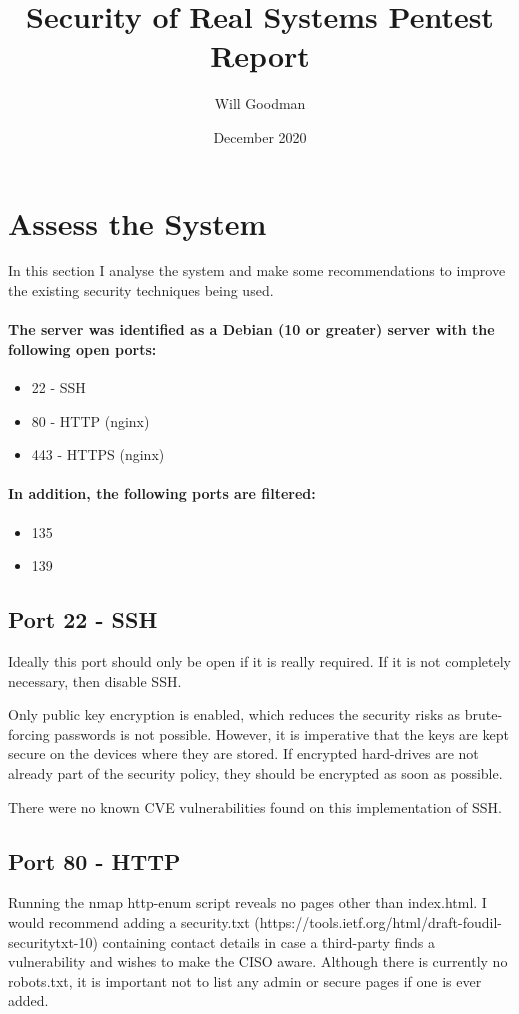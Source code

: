 \documentclass[12pt]{article}
\title{Security of Real Systems Pentest Report}
\date{December 2020}
\author{Will Goodman}
\begin{document}
  \maketitle

  \section{Assess the System}
  In this section I analyse the system and make some recommendations to improve the existing security techniques being used.

  \paragraph{The server was identified as a Debian (10 or greater) server with the following open ports:}
  \begin{itemize}
    \item 22 - SSH
    \item 80 - HTTP (nginx)
    \item 443 - HTTPS (nginx)
  \end{itemize}
  \paragraph{In addition, the following ports are filtered:}
  \begin{itemize}
    \item 135
    \item 139
  \end{itemize}

  \subsection{Port 22 - SSH}
  Ideally this port should only be open if it is really required.
  If it is not completely necessary, then disable SSH.

  Only public key encryption is enabled, which reduces the security risks as brute-forcing passwords is not possible.
  However, it is imperative that the keys are kept secure on the devices where they are stored.
  If encrypted hard-drives are not already part of the security policy, they should be encrypted as soon as possible.

  There were no known CVE vulnerabilities found on this implementation of SSH.

  \subsection{Port 80 - HTTP}
  Running the nmap http-enum script reveals no pages other than index.html.
  I would recommend adding a security.txt (https://tools.ietf.org/html/draft-foudil-securitytxt-10) containing contact details in case a third-party finds a vulnerability and wishes to make the CISO aware.
  Although there is currently no robots.txt, it is important not to list any admin or secure pages if one is ever added.
\end{document}
